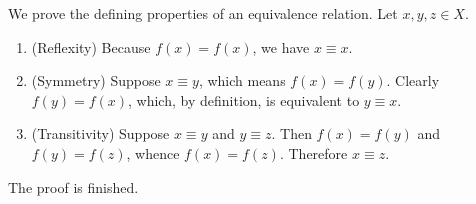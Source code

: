 \begin{questions}
\begin{theproof} We prove the defining properties of an equivalence relation. Let \(x,y,z\in X\).
\begin{enumerate}[label=(\roman*)]
    \item (Reflexity) Because   \(f(x) = f(x)\), we have  \(x\equiv x\).
    \item (Symmetry) Suppose \(x\equiv y\), which means \(f(x) = f(y)\). Clearly \(f(y) = f(x)\), which, by definition, is equivalent to  \(y\equiv x\).
    \item (Transitivity) Suppose \(x\equiv y\) and \(y\equiv z\). Then \(f(x) = f(y)\) and \(f(y) = f(z)\), whence \(f(x) = f(z)\). Therefore \(x\equiv z\).
\end{enumerate}
    The proof is finished.
\end{theproof}
\end{questions}